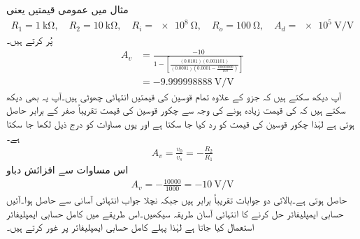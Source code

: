 مثال  میں  عمومی قیمتیں یعنی 
\begin{align*}
R_1=\SI{1}{\kilo\ohm}, \quad R_2=\SI{10}{\kilo\ohm}, \quad R_i=\SI{e8}{\ohm}, \quad R_o=\SI{100}{\ohm}, \quad A_d=\SI{e5}{\volt\per\volt}
\end{align*}
پُر کرتے ہیں۔
\begin{align*}
A_v&=\frac{-10}{1-\left[\frac{\left(0.0101\right)\left(0.001101\right)}{\left(0.0001\right)\left(0.0001-\frac{100000000}{100}\right)}\right]} \\
&=\SI{-9.999998888}{\volt\per\volt}
\end{align*}
آپ دیکھ سکتے ہیں کہ  جزو کے علاوہ تمام قوسین کی قیمتیں انتہائی چھوٹی ہیں۔آپ یہ بھی دیکھ سکتے ہیں کہ  کی قیمت زیادہ ہونے کی وجہ سے چکور قوسین کی قیمت تقریباً صفر کے برابر حاصل ہوتی ہے لہٰذا چکور قوسین کی قیمت کو رد کیا جا سکتا ہے اور یوں مساوات  کو درج ذیل لکھا جا سکتا ہے۔
\begin{align}\label{مساوات_حسابی_غیر_کامل_حل}
A_v=\frac{v_0}{v_s}=-\frac{R_2}{R_1}
\end{align}
اس مساوات سے افزائش دباو 
\begin{align*}
A_v=-\frac{10000}{1000}=\SI{-10}{\volt\per\volt}
\end{align*}
حاصل ہوتی ہے۔بالائی دو جوابات تقریباً برابر ہیں جبکہ نچلا جواب انتہائی آسانی سے حاصل ہوا۔آئیں حسابی ایمپلیفائر حل کرنے کا انتہائی آسان طریقہ سیکھیں۔اس طریقے میں کامل حسابی ایمپلیفائر استعمال کیا جاتا ہے لہٰذا پہلے کامل حسابی ایمپلیفائر پر غور کرتے ہیں۔

